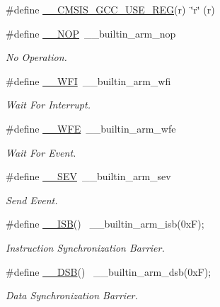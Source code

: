 \begin{DoxyCompactItemize}
\item 
\#define \hyperlink{group___c_m_s_i_s___core___instruction_interface_ga9d94dee7402367961d2cf0accc00fd97}{\+\_\+\+\_\+\+C\+M\+S\+I\+S\+\_\+\+G\+C\+C\+\_\+\+U\+S\+E\+\_\+\+R\+EG}(r)~\char`\"{}r\char`\"{} (r)
\item 
\#define \hyperlink{group___c_m_s_i_s___core___instruction_interface_gabd585ddc865fb9b7f2493af1eee1a572}{\+\_\+\+\_\+\+N\+OP}~\+\_\+\+\_\+builtin\+\_\+arm\+\_\+nop
\begin{DoxyCompactList}\small\item\em No Operation. \end{DoxyCompactList}\item 
\#define \hyperlink{group___c_m_s_i_s___core___instruction_interface_gad23bf2b78a9a4524157c9de0d30b7448}{\+\_\+\+\_\+\+W\+FI}~\+\_\+\+\_\+builtin\+\_\+arm\+\_\+wfi
\begin{DoxyCompactList}\small\item\em Wait For Interrupt. \end{DoxyCompactList}\item 
\#define \hyperlink{group___c_m_s_i_s___core___instruction_interface_gaac6cc7dd4325d9cb40d3290fa5244b3d}{\+\_\+\+\_\+\+W\+FE}~\+\_\+\+\_\+builtin\+\_\+arm\+\_\+wfe
\begin{DoxyCompactList}\small\item\em Wait For Event. \end{DoxyCompactList}\item 
\#define \hyperlink{group___c_m_s_i_s___core___instruction_interface_gaab4f296d0022b4b10dc0976eb22052f9}{\+\_\+\+\_\+\+S\+EV}~\+\_\+\+\_\+builtin\+\_\+arm\+\_\+sev
\begin{DoxyCompactList}\small\item\em Send Event. \end{DoxyCompactList}\item 
\#define \hyperlink{group___c_m_s_i_s___core___instruction_interface_ga68c4c79e495bf41aa668af9b373f1229}{\+\_\+\+\_\+\+I\+SB}()            ~\+\_\+\+\_\+builtin\+\_\+arm\+\_\+isb(0x\+F);
\begin{DoxyCompactList}\small\item\em Instruction Synchronization Barrier. \end{DoxyCompactList}\item 
\#define \hyperlink{group___c_m_s_i_s___core___instruction_interface_ga1b8c2222cb9963203cc07623e1c70aeb}{\+\_\+\+\_\+\+D\+SB}()            ~\+\_\+\+\_\+builtin\+\_\+arm\+\_\+dsb(0x\+F);
\begin{DoxyCompactList}\small\item\em Data Synchronization Barrier. \end{DoxyCompactList}\item 

\end{DoxyCompactItemize}

